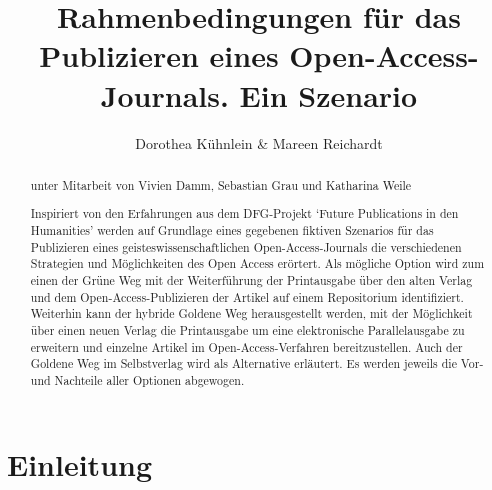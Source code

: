 \documentclass[a4paper,
fontsize=11pt,
oneside,
numbers=noperiodatend,
parskip=half-,
bibliography=totoc,
final
]{scrartcl}
\title{\LARGE{Rahmenbedingungen für das Publizieren eines Open-Access-Journals. Ein Szenario}} %
\author{Dorothea Kühnlein \& Mareen Reichardt} %
\date{}
\begin{document}
\maketitle
\thispagestyle{fancyplain} 

\begin{abstract}
unter Mitarbeit von Vivien Damm, Sebastian Grau und Katharina Weile

Inspiriert von den Erfahrungen aus dem DFG-Projekt `Future Publications
in den Humanities' werden auf Grundlage eines gegebenen fiktiven
Szenarios für das Publizieren eines geisteswissenschaftlichen
Open-Access-Journals die verschiedenen Strategien und Möglichkeiten des
Open Access erörtert. Als mögliche Option wird zum einen der Grüne Weg
mit der Weiterführung der Printausgabe über den alten Verlag und dem
Open-Access-Publizieren der Artikel auf einem Repositorium
identifiziert. Weiterhin kann der hybride Goldene Weg herausgestellt
werden, mit der Möglichkeit über einen neuen Verlag die Printausgabe um
eine elektronische Parallelausgabe zu erweitern und einzelne Artikel im
Open-Access-Verfahren bereitzustellen. Auch der Goldene Weg im
Selbstverlag wird als Alternative erläutert. Es werden jeweils die Vor-
und Nachteile aller Optionen abgewogen.
\end{abstract}

\section*{Einleitung}\label{einleitung}
\end{document}
